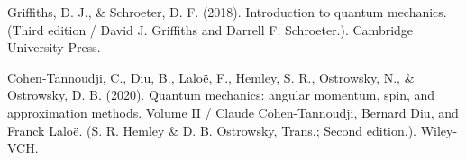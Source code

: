 \begin{thebibliography}{9}
Griffiths, D. J., \& Schroeter, D. F. (2018). Introduction to quantum mechanics. (Third edition / David J. Griffiths and Darrell F. Schroeter.). Cambridge University Press.

Cohen-Tannoudji, C., Diu, B., Laloë, F., Hemley, S. R., Ostrowsky, N., \& Ostrowsky, D. B. (2020). Quantum mechanics: angular momentum, spin, and approximation methods. Volume II / Claude Cohen-Tannoudji, Bernard Diu, and Franck Laloë. (S. R. Hemley \& D. B. Ostrowsky, Trans.; Second edition.). Wiley-VCH.

\end{thebibliography}